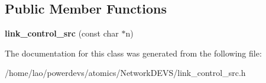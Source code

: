 \subsection*{Public Member Functions}
\begin{DoxyCompactItemize}
\item 
{\bfseries link\+\_\+control\+\_\+src} (const char $\ast$n)\hypertarget{classlink__control__src_a79f13f3b34d4d89a5c2b040a49468e60}{}\label{classlink__control__src_a79f13f3b34d4d89a5c2b040a49468e60}

\end{DoxyCompactItemize}


The documentation for this class was generated from the following file\+:\begin{DoxyCompactItemize}
\item 
/home/lao/powerdevs/atomics/\+Network\+D\+E\+V\+S/link\+\_\+control\+\_\+src.\+h\end{DoxyCompactItemize}
